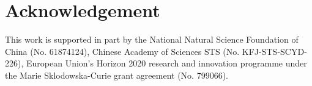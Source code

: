 \section*{Acknowledgement}
This work is supported in part by the National Natural Science Foundation 
of China (No. 61874124), Chinese Academy of Sciences STS (No. KFJ-STS-SCYD-226), 
European Union's Horizon 2020 research and innovation programme under the 
Marie Sklodowska-Curie grant agreement (No. 799066).
